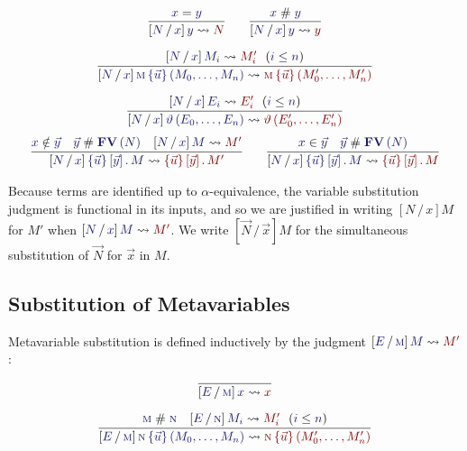\documentclass[11pt]{article}
\theoremstyle{definition}
\theoremstyle{remark}
\numberwithin{equation}{section}
\def\IModeColorName{MidnightBlue}
\def\OModeColorName{Maroon}
\newcommand\IMode[1]{{\color{\IModeColorName}{#1}}}
\newcommand\OMode[1]{{\color{\OModeColorName}{#1}}}
\newcommand\HypJ[2]{#1\ \ (#2)}
\newcommand\Member[2]{\IMode{#1}\in\IMode{#2}}
\newcommand\MkBTm[3]{\left\{#1\right\}\left[#2\right].\, #3}
\newcommand\Leq[2]{\IMode{#1}\leq\IMode{#2}}
\newcommand\MV[1]{\textsc{#1}}
\newcommand\MApp[3]{#1\left\{#2\right\}\left(#3\right)}
\newcommand\App[2]{#1\left(#2\right)}
\newcommand\FV[1]{\mathbf{FV}\left(#1\right)}
\newcommand\NotIn[2]{\IMode{#1}\notin\IMode{#2}}
\newcommand\Subst[3]{
  \left[#1\, /\, #2\right]#3%
}
\newcommand\IsSubst[4]{%
  \Subst{\IMode{#1}}{\IMode{#2}}{\IMode{#3}}%
  \leadsto\OMode{#4}%
}
\newcommand\IsEq[2]{\IMode{#1} = \IMode{#2}}
\newcommand\IsApart[2]{\IMode{#1} \mathrel{\#} \IMode{#2}}
\begin{document}
\begin{gather*}
  \infer{
    \IsSubst{N}{x}{y}{N}
  }{
    \IsEq{x}{y}
  }\qquad
  \infer{
    \IsSubst{N}{x}{y}{y}
  }{
    \IsApart{x}{y}
  }\\[6pt]
  \infer{
    \IsSubst{N}{x}{
      \MApp{\MV{m}}{\vec{u}}{M_0,\dots,M_n}
    }{
      \MApp{\MV{m}}{\vec{u}}{M'_0,\dots,M'_n}
    }
  }{
    \HypJ{
      \IsSubst{N}{x}{M_i}{M'_i}
    }{
      \Leq{i}{n}
    }
  }\\[6pt]
  \infer{
    \IsSubst{N}{x}{
      \App{\vartheta}{E_0,\dots,E_n}
    }{
      \App{\vartheta}{E'_0,\dots,E'_n}
    }
  }{
    \HypJ{
      \IsSubst{N}{x}{E_i}{E'_i}
    }{
      \Leq{i}{n}
    }
  }
\end{gather*}
\begin{gather*}
  \infer{
    \IsSubst{N}{x}{
      \MkBTm{\vec{u}}{\vec{y}}{M}
    }{
      \MkBTm{\vec{u}}{\vec{y}}{M'}
    }
  }{
    \NotIn{x}{\vec{y}} &
    \IsApart{\vec{y}}{\FV{N}} &
    \IsSubst{N}{x}{M}{M'}
  }\qquad
  \infer{
    \IsSubst{N}{x}{
      \MkBTm{\vec{u}}{\vec{y}}{M}
    }{
      \MkBTm{\vec{u}}{\vec{y}}{M}
    }
  }{
    \Member{x}{\vec{y}} &
    \IsApart{\vec{y}}{\FV{N}}
  }
\end{gather*}

Because terms are identified up to $\alpha$-equivalence, the variable
substitution judgment is functional in its inputs, and so we are justified in
writing $\Subst{N}{x}{M}$ for $M'$ when $\IsSubst{N}{x}{M}{M'}$. We write
$\Subst{\vec{N}}{\vec{x}}{M}$ for the simultaneous substitution of $\vec{N}$
for $\vec{x}$ in $M$.

\subsection{Substitution of Metavariables}

Metavariable substitution is defined inductively by the judgment
$\IsSubst{E}{\MV{m}}{M}{M'}$:

\begin{gather*}
  \infer{
    \IsSubst{E}{\MV{m}}{x}{x}
  }{
  }\\[6pt]
  \infer{
    \IsSubst{E}{\MV{m}}{
      \MApp{\MV{n}}{\vec{u}}{M_0,\dots,M_n}
    }{
      \MApp{\MV{n}}{\vec{u}}{M'_0,\dots,M'_n}
    }
  }{
    \IsApart{\MV{m}}{\MV{n}} &
    \HypJ{
      \IsSubst{E}{\MV{n}}{M_i}{M'_i}
    }{
      \Leq{i}{n}
    }
  }\\[6pt]
\end{gather*}
\end{document}
